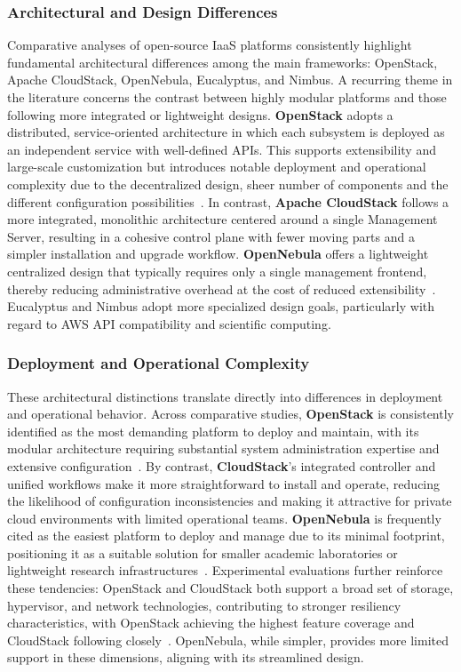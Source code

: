 \documentclass[sigplan]{acmart}
\begin{document}
        \subsubsection{Architectural and Design Differences}
            Comparative analyses of open-source IaaS platforms consistently highlight fundamental architectural differences among the main frameworks: OpenStack, Apache CloudStack, OpenNebula, Eucalyptus, and Nimbus. A recurring theme in the literature concerns the contrast between highly modular platforms and those following more integrated or lightweight designs. \textbf{OpenStack} adopts a distributed, service-oriented architecture in which each subsystem is deployed as an independent service with well-defined APIs. This supports extensibility and large-scale customization but introduces notable deployment and operational complexity due to the decentralized design, sheer number of components and the different configuration possibilities~\cite{barkatOpenSourceSolutions2015}. In contrast, \textbf{Apache CloudStack} follows a more integrated, monolithic architecture centered around a single Management Server, resulting in a cohesive control plane with fewer moving parts and a simpler installation and upgrade workflow. \textbf{OpenNebula} offers a lightweight centralized design that typically requires only a single management frontend, thereby reducing administrative overhead at the cost of reduced extensibility~\cite{arunaOpenSourceIaaS2016}. Eucalyptus and Nimbus adopt more specialized design goals, particularly with regard to AWS API compatibility and scientific computing.
        
        \subsubsection{Deployment and Operational Complexity}
            These architectural distinctions translate directly into differences in deployment and operational behavior. Across comparative studies, \textbf{OpenStack} is consistently identified as the most demanding platform to deploy and maintain, with its modular architecture requiring substantial system administration expertise and extensive configuration~\cite{lynnComparativeStudyCurrent2015, barkatOpenSourceSolutions2015}. By contrast, \textbf{CloudStack}'s integrated controller and unified workflows make it more straightforward to install and operate, reducing the likelihood of configuration inconsistencies and making it attractive for private cloud environments with limited operational teams. \textbf{OpenNebula} is frequently cited as the easiest platform to deploy and manage due to its minimal footprint, positioning it as a suitable solution for smaller academic laboratories or lightweight research infrastructures~\cite{barkatOpenSourceSolutions2015}. Experimental evaluations further reinforce these tendencies: OpenStack and CloudStack both support a broad set of storage, hypervisor, and network technologies, contributing to stronger resiliency characteristics, with OpenStack achieving the highest feature coverage and CloudStack following closely~\cite{vogelPrivateIaaSClouds2016}. OpenNebula, while simpler, provides more limited support in these dimensions, aligning with its streamlined design.
        
\end{document}
